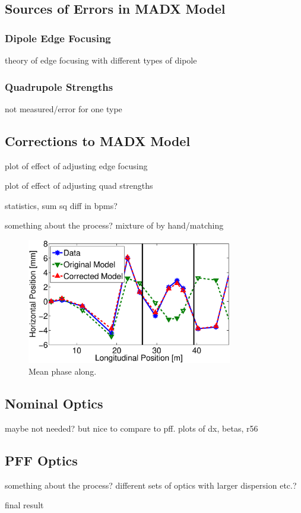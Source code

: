 \subsection{Sources of Errors in MADX Model}
\label{ss:modelErrorSources}

\subsubsection{Dipole Edge Focusing}
\label{sss:edgeFocusing}

theory of edge focusing with different types of dipole

\subsubsection{Quadrupole Strengths}
\label{sss:quadStrengths}

not measured/error for one type

\subsection{Corrections to MADX Model}
\label{ss:modelCorrections}

plot of effect of adjusting edge focusing

plot of effect of adjusting quad strengths

statistics, sum sq diff in bpms?

something about the process? mixture of by hand/matching

\begin{figure}
  \centering
  \includegraphics[width=0.8\textwidth]{Figures/opticsCorrVsOrig}
  \caption{Mean phase along.}
  \label{f:opticsCorrVsOrig}
\end{figure}


\subsection{Nominal Optics}
\label{ss:nominalMatched}

maybe not needed? but nice to compare to pff. plots of dx, betas, r56

\subsection{PFF Optics}
\label{ss:pffMatched}

something about the process? different sets of optics with larger dispersion etc.?

final result
